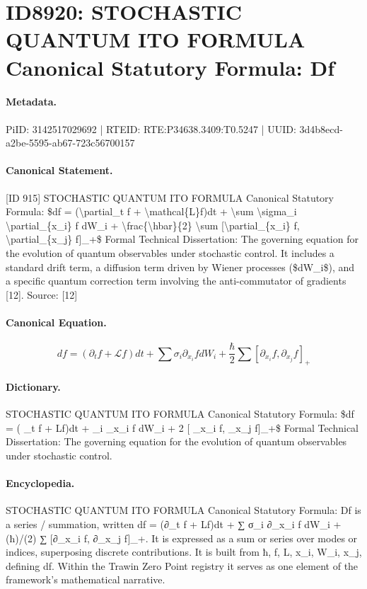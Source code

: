 \section*{ID8920: STOCHASTIC QUANTUM ITO FORMULA Canonical Statutory Formula: Df}
\paragraph{Metadata.}
PiID: 3142517029692 | RTEID: RTE:P34638.3409:T0.5247 | UUID: 3d4b8ecd-a2be-5595-ab67-723c56700157

\paragraph{Canonical Statement.}
[ID 915] STOCHASTIC QUANTUM ITO FORMULA Canonical Statutory Formula: \$df = (\textbackslash{}partial\_t f + \textbackslash{}mathcal\{L\}f)dt + \textbackslash{}sum \textbackslash{}sigma\_i \textbackslash{}partial\_\{x\_i\} f dW\_i + \textbackslash{}frac\{\textbackslash{}hbar\}\{2\} \textbackslash{}sum [\textbackslash{}partial\_\{x\_i\} f, \textbackslash{}partial\_\{x\_j\} f]\_+\$ Formal Technical Dissertation: The governing equation for the evolution of quantum observables under stochastic control. It includes a standard drift term, a diffusion term driven by Wiener processes (\$dW\_i\$), and a specific quantum correction term involving the anti-commutator of gradients [12]. Source: [12]

\paragraph{Canonical Equation.}
\[
df = (\partial_t f + \mathcal{L}f)dt + \sum \sigma_i \partial_{x_i} f dW_i + \frac{\hbar}{2} \sum [\partial_{x_i} f, \partial_{x_j} f]_+
\]

\paragraph{Dictionary.}
STOCHASTIC QUANTUM ITO FORMULA Canonical Statutory Formula: \$df = ( \_t f + Lf)dt + \_i \_x\_i f dW\_i + 2 [ \_x\_i f, \_x\_j f]\_+\$ Formal Technical Dissertation: The governing equation for the evolution of quantum observables under stochastic control.

\paragraph{Encyclopedia.}
STOCHASTIC QUANTUM ITO FORMULA Canonical Statutory Formula: Df is a series / summation, written df = (∂\_t f + Lf)dt + ∑ σ\_i ∂\_x\_i f dW\_i + (ħ)/(2) ∑ [∂\_x\_i f, ∂\_x\_j f]\_+. It is expressed as a sum or series over modes or indices, superposing discrete contributions. It is built from ħ, f, L, x\_i, W\_i, x\_j, defining df. Within the Trawin Zero Point registry it serves as one element of the framework's mathematical narrative.
